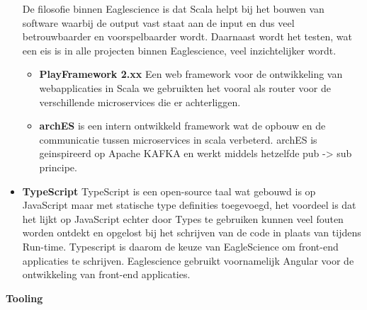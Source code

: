 \begin{itemize}
De filosofie binnen Eaglescience is dat Scala helpt bij het bouwen van software waarbij de output vast staat aan de input en dus veel betrouwbaarder en voorspelbaarder wordt. Daarnaast wordt het testen, wat een eis is in alle projecten binnen Eaglescience, veel inzichtelijker wordt.
  \begin{itemize}
    \item \textbf{PlayFramework 2.xx} Een web framework voor de ontwikkeling van webapplicaties in Scala we gebruikten het vooral als router voor de verschillende microservices die er achterliggen.
    \item \textbf{archES} is een intern ontwikkeld framework wat de opbouw en de communicatie tussen microservices in scala verbeterd. archES is geinspireerd op Apache KAFKA en werkt middels hetzelfde pub -> sub principe.
  \end{itemize}
\item \textbf{TypeScript} TypeScript is een open-source taal wat gebouwd is op JavaScript maar met statische type definities toegevoegd, het voordeel is dat het lijkt op JavaScript echter door Types te gebruiken kunnen veel fouten worden ontdekt en opgelost bij het schrijven van de code in plaats van tijdens Run-time. Typescript is daarom de keuze van EagleScience om front-end applicaties te schrijven. Eaglescience gebruikt voornamelijk Angular voor de ontwikkeling van front-end applicaties.
\end{itemize}
\textbf{Tooling}
